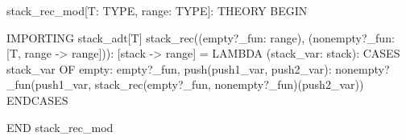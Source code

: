 stack_rec_mod[T: TYPE, range: TYPE]: THEORY
  BEGIN
  
  IMPORTING stack_adt[T]
  stack_rec((empty?_fun: range), (nonempty?_fun: [T, range -> range])):
    [stack -> range] =
        LAMBDA (stack_var: stack):
          CASES stack_var OF
            empty: empty?_fun,
            push(push1_var, push2_var):
                nonempty?_fun(push1_var,
                              stack_rec(empty?_fun,
                                        nonempty?_fun)(push2_var))
          ENDCASES
  
  END stack_rec_mod
